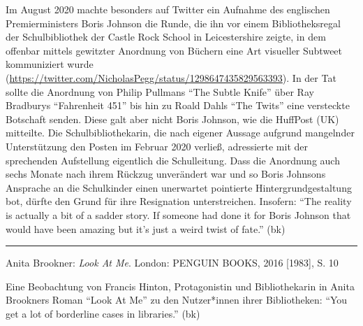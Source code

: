 \documentclass[a4paper,
fontsize=11pt,
oneside,
numbers=noperiodatend,
parskip=half-,
bibliography=totoc,
final
]{scrartcl}
\begin{document}
Im August 2020 machte besonders auf Twitter ein Aufnahme des englischen
Premierministers Boris Johnson die Runde, die ihn vor einem
Bibliotheksregal der Schulbibliothek der Castle Rock School in
Leicestershire zeigte, in dem offenbar mittels gewitzter Anordnung von
Büchern eine Art visueller Subtweet kommuniziert wurde
(\url{https://twitter.com/NicholasPegg/status/1298647435829563393}).
In der Tat sollte die Anordnung von Philip Pullmans \enquote{The Subtle
Knife} über Ray Bradburys \enquote{Fahrenheit 451} bis hin zu Roald
Dahls \enquote{The Twits} eine versteckte Botschaft senden. Diese galt
aber nicht Boris Johnson, wie die HuffPost (UK) mitteilte. Die
Schulbibliothekarin, die nach eigener Aussage aufgrund mangelnder
Unterstützung den Posten im Februar 2020 verließ, adressierte mit der
sprechenden Aufstellung eigentlich die Schulleitung. Dass die Anordnung
auch sechs Monate nach ihrem Rückzug unverändert war und so Boris
Johnsons Ansprache an die Schulkinder einen unerwartet pointierte
Hintergrundgestaltung bot, dürfte den Grund für ihre Resignation
unterstreichen. Insofern: \enquote{The reality is actually a bit of a
sadder story. If someone had done it for Boris Johnson that would have
been amazing but it's just a weird twist of fate.} (bk)

\begin{center}\rule{0.5\linewidth}{0.5pt}\end{center}

Anita Brookner: \emph{Look At Me}. London: PENGUIN BOOKS, 2016
{[}1983{]}, S. 10

Eine Beobachtung von Francis Hinton, Protagonistin und Bibliothekarin in
Anita Brookners Roman \enquote{Look At Me} zu den Nutzer*innen ihrer
Bibliotheken: \enquote{You get a lot of borderline cases in libraries.}
(bk)

\end{document}
